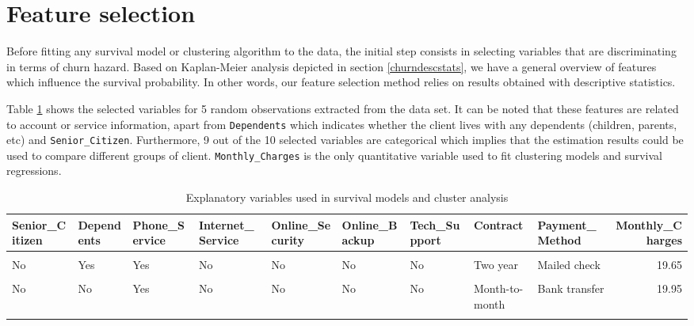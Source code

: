 \documentclass[
]{book}
\begin{document}
\hypertarget{featureselection}{%
\section{Feature selection}\label{featureselection}}

Before fitting any survival model or clustering algorithm to the data, the initial step consists in selecting variables that are discriminating in terms of churn hazard. Based on Kaplan-Meier analysis depicted in section \ref{churndescstats}, we have a general overview of features which influence the survival probability. In other words, our feature selection method relies on results obtained with descriptive statistics.

Table \ref{tab:selectedfeatures} shows the selected variables for 5 random observations extracted from the data set. It can be noted that these features are related to account or service information, apart from \texttt{Dependents} which indicates whether the client lives with any dependents (children, parents, etc) and \texttt{Senior\_Citizen}. Furthermore, 9 out of the 10 selected variables are categorical which implies that the estimation results could be used to compare different groups of client. \texttt{Monthly\_Charges} is the only quantitative variable used to fit clustering models and survival regressions.

\begin{table}[H]

\caption{\label{tab:selectedfeatures}Explanatory variables used in survival models and cluster analysis}
\centering
\begin{tabular}[t]{lllllllllr}
\toprule
Senior\_Citizen & Dependents & Phone\_Service & Internet\_Service & Online\_Security & Online\_Backup & Tech\_Support & Contract & Payment\_Method & Monthly\_Charges\\
\midrule
\cellcolor{gray!6}{Yes} & \cellcolor{gray!6}{No} & \cellcolor{gray!6}{Yes} & \cellcolor{gray!6}{DSL} & \cellcolor{gray!6}{No} & \cellcolor{gray!6}{Yes} & \cellcolor{gray!6}{No} & \cellcolor{gray!6}{Month-to-month} & \cellcolor{gray!6}{Bank transfer} & \cellcolor{gray!6}{50.40}\\
No & Yes & Yes & No & No & No & No & Two year & Mailed check & 19.65\\
\cellcolor{gray!6}{No} & \cellcolor{gray!6}{Yes} & \cellcolor{gray!6}{Yes} & \cellcolor{gray!6}{Fiber optic} & \cellcolor{gray!6}{Yes} & \cellcolor{gray!6}{Yes} & \cellcolor{gray!6}{Yes} & \cellcolor{gray!6}{Two year} & \cellcolor{gray!6}{Credit card} & \cellcolor{gray!6}{114.30}\\
No & No & Yes & No & No & No & No & Month-to-month & Bank transfer & 19.95\\
\cellcolor{gray!6}{No} & \cellcolor{gray!6}{No} & \cellcolor{gray!6}{Yes} & \cellcolor{gray!6}{DSL} & \cellcolor{gray!6}{Yes} & \cellcolor{gray!6}{No} & \cellcolor{gray!6}{Yes} & \cellcolor{gray!6}{Month-to-month} & \cellcolor{gray!6}{Mailed check} & \cellcolor{gray!6}{54.45}\\
\bottomrule
\end{tabular}
\end{table}
\end{document}
